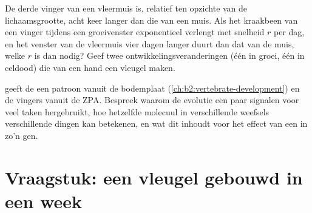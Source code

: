 \begin{exercise}[$\star\star\star$]\label{exo:b2:limb-organogenesis:11}
De derde vinger van een vleermuis is, relatief ten opzichte van de
lichaamsgrootte, acht keer langer dan die van een muis. Als het kraakbeen
van een vinger tijdens een groeivenster exponentieel verlengt met snelheid
$r$ per dag, en het venster van de vleermuis vier dagen langer duurt dan
dat van de muis, welke $r$ is dan nodig? Geef twee
ontwikkelingsveranderingen (één in groei, één in celdood) die van een hand
een vleugel maken.
\end{exercise}

\begin{exercise}[$\star\star\star$]\label{exo:b2:limb-organogenesis:12}
 geeft de  een patroon vanuit de bodemplaat
(\cref{ch:b2:vertebrate-development}) en de vingers vanuit de ZPA.
Bespreek waarom de evolutie een paar signalen voor veel taken hergebruikt,
hoe hetzelfde molecuul in verschillende weefsels verschillende dingen kan
betekenen, en wat dit inhoudt voor het effect van een  in zo'n gen.
\end{exercise}

\section{Vraagstuk: een vleugel gebouwd in een week}

